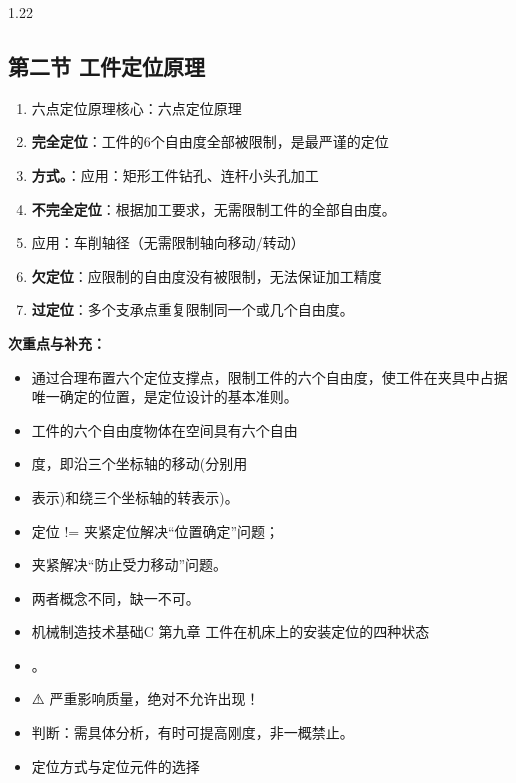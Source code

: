 \documentclass[12pt,a4paper]{article}
\begin{document}
\begin{spacing}{1.22}
\subsection{第二节 工件定位原理}
\begin{tcolorbox}[colback=yellow!6,colframe=red!55!black,title=重点,left=1mm,right=1mm]
\begin{enumerate}[leftmargin=2.2em,label=\arabic*.]
  \item 六点定位原理核心：六点定位原理
  \item \textbf{完全定位}：工件的6个自由度全部被限制，是最严谨的定位
  \item \textbf{方式。}：应用：矩形工件钻孔、连杆小头孔加工
  \item \textbf{不完全定位}：根据加工要求，无需限制工件的全部自由度。
  \item 应用：车削轴径（无需限制轴向移动/转动）
  \item \textbf{欠定位}：应限制的自由度没有被限制，无法保证加工精度
  \item \textbf{过定位}：多个支承点重复限制同一个或几个自由度。
\end{enumerate}
\end{tcolorbox}
\noindent\textbf{次重点与补充：}
\begin{itemize}[leftmargin=2.2em,label=--]
  \item 通过合理布置六个定位支撑点，限制工件的六个自由度，使工件在夹具中占据唯一确定的位置，是定位设计的基本准则。
  \item 工件的六个自由度物体在空间具有六个自由
  \item 度，即沿三个坐标轴的移动(分别用
  \item 表示)和绕三个坐标轴的转表示)。
  \item 定位 != 夹紧定位解决“位置确定”问题；
  \item 夹紧解决“防止受力移动”问题。
  \item 两者概念不同，缺一不可。
  \item 机械制造技术基础C 第九章 工件在机床上的安装定位的四种状态
  \item 。
  \item ⚠️ 严重影响质量，绝对不允许出现！
  \item 判断：需具体分析，有时可提高刚度，非一概禁止。
  \item 定位方式与定位元件的选择
\end{itemize}


\end{spacing}
\end{document}
